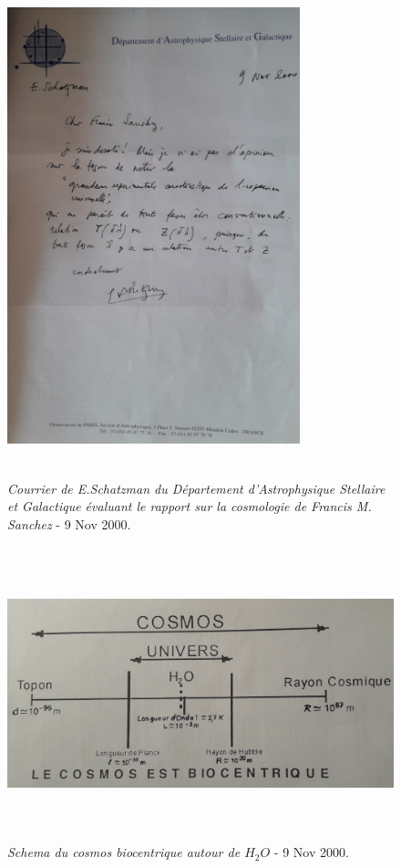 \documentclass[a4paper,12pt]{article}
\begin{document}
\begin{appendix}
\begin{figure}
\centering
\includegraphics[width=8.5cm,height=14.5cm]{./figures/schatzmann.png}
\caption[Courrier d'evaluation d'E.Schatzman]{\textit{Courrier de E.Schatzman du Département d'Astrophysique Stellaire et Galactique évaluant le rapport sur la cosmologie de Francis M. Sanchez} - 9 Nov 2000.} 
\label{fig:12:figure12}
\end{figure}


\begin{figure}
\centering
\includegraphics[width=14.5cm,height=8.5cm]{./figures/h2o-biocentrique.jpg}
\caption[Schema du Cosmos Biocentrique $H_2O$ ]{\textit{Schema du cosmos biocentrique autour de $H_2O$} - 9 Nov 2000.} 
\label{fig:13:figure13}
\end{figure}


\end{appendix}
\end{document}

